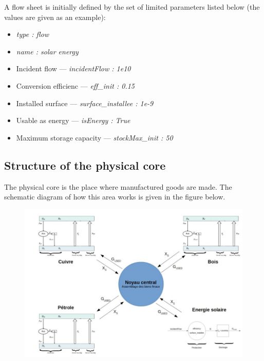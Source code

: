 \documentclass[12pt,a4paper]{article}%
\begin{document}
A flow sheet is initially defined by the set of limited parameters listed below (the values are given as an example):

\begin{itemize}
\item \textit{type : flow}

\item \textit{name : solar energy}

\item Incident flow ---  \textit{incidentFlow : 1e10}

\item Conversion efficienc ---  \textit{eff\_init : 0.15}

\item Installed surface ---  \textit{surface\_installee : 1e-9}

\item Usable as energy ---  \textit{isEnergy : True }

\item Maximum storage capacity ---  \textit{stockMax\_init : 50}
\end{itemize}

\subsection{Structure of the physical core}

The physical core is the place where manufactured goods are made. The schematic diagram of how this area works is given in the figure below.

\begin{figure}[h]
\centering \includegraphics[width=1.0\textwidth]{figures/NoyauCentral.jpg}\end{figure}
\end{document}
